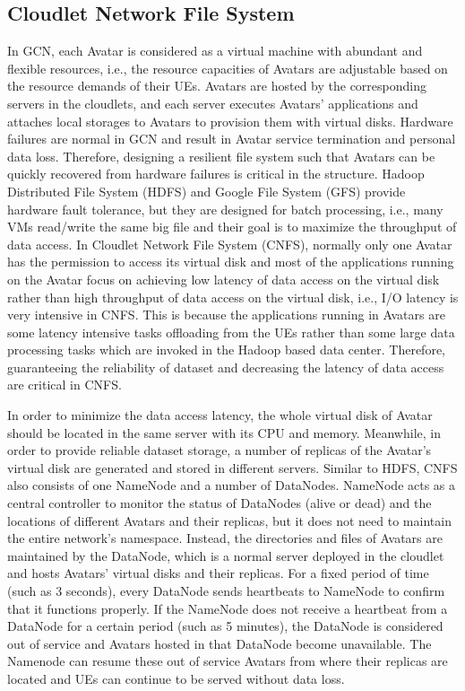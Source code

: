\documentclass[journal,12pt,draftclsnofoot,onecolumn]{IEEEtran}
\begin{document}
\subsection{Cloudlet Network File System}
In GCN, each Avatar is considered as a virtual machine with abundant and flexible resources, i.e., the resource capacities of Avatars are adjustable based on the resource demands of their UEs. Avatars are hosted by the corresponding servers in the cloudlets, and each server executes Avatars' applications and attaches local storages to Avatars to provision them with virtual disks. Hardware failures are normal in GCN and result in Avatar service termination and personal data loss. Therefore, designing a resilient file system such that Avatars can be quickly recovered from hardware failures is critical in the structure. Hadoop Distributed File System (HDFS) and Google File System (GFS) provide hardware fault tolerance, but they are designed for batch processing, i.e., many VMs read/write the same big file and their goal is to maximize the throughput of data access. In Cloudlet Network File System (CNFS), normally only one Avatar has the permission to access its virtual disk and most of the applications running on the Avatar focus on achieving low latency of data access on the virtual disk rather than high throughput of data access on the virtual disk, i.e., I/O latency is very intensive in CNFS. This is because the applications running in Avatars are some latency intensive tasks offloading from the UEs rather than some large data processing tasks which are invoked in the Hadoop based data center. Therefore, guaranteeing the reliability of dataset and decreasing the latency of data access are critical in CNFS.

In order to minimize the data access latency, the whole virtual disk of Avatar should be located in the same server with its CPU and memory. Meanwhile, in order to provide reliable dataset storage, a number of replicas of the Avatar's virtual disk are generated and stored in different servers. Similar to HDFS, CNFS also consists of one NameNode and a number of DataNodes. NameNode acts as a central controller to monitor the status of DataNodes (alive or dead) and the locations of different Avatars and their replicas, but it does not need to maintain the entire network's namespace. Instead, the directories and files of Avatars are maintained by the DataNode, which is a normal server deployed in the cloudlet and hosts Avatars' virtual disks and their replicas. For a fixed period of time (such as 3 seconds), every DataNode sends heartbeats to NameNode to confirm that it functions properly. If the NameNode does not receive a heartbeat from a DataNode for a certain period (such as 5 minutes), the DataNode is considered out of service and Avatars hosted in that DataNode become unavailable. The Namenode can resume these out of service Avatars from where their replicas are located and UEs can continue to be served without data loss.
\end{document}
